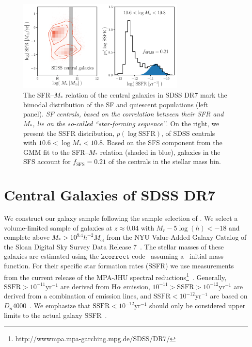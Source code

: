 \documentclass[12pt, letterpaper, preprint, tighten]{aastex62}
\begin{document}
\begin{figure}
\begin{center}
\includegraphics[width=0.75\textwidth]{figs/groupcat.pdf}
    \caption{The SFR--$M_*$ relation of the central galaxies in SDSS DR7
    mark the bimodal distribution of the SF and quiescent populations (left panel). 
    \emph{SF centrals, based on the correlation between their
    SFR and $M_*$, lie on the so-called ``star-forming sequence''}.
    On the right, we present the SSFR distribution, $p(\log\mathrm{SSFR})$,
    of SDSS centrals with $10.6 < \log M_* < 10.8$. Based on the SFS component
    from the \cite{hahn2018a} GMM fit to the SFR--$M_*$ relation (shaded in blue),
    galaxies in the SFS account for $f_\mathrm{SFS} = 0.21$ of the centrals
    in the stellar mass bin.} \label{fig:groupcat}
\end{center}
\end{figure}

\section{Central Galaxies of SDSS DR7} \label{sec:sdss}
We construct our galaxy sample following the sample selection of \cite{tinker2011}.
We select a volume-limited sample of galaxies at $z \approx 0.04$ with
$M_r - 5 \log(h) < -18$ and complete above $M_* > 10^{9.4} h^{-2}M_\odot$ from
the NYU Value-Added Galaxy Catalog \citep[VAGC;][]{blanton2005} of the
Sloan Digital Sky Survey Data Release 7~\citep[SDSS DR7;][]{abazajian2009}.
The stellar masses of these galaxies are estimated using the
$\mathtt{kcorrect}$ code~\citep{blanton2007} assuming a~\cite{chabrier2003}
initial mass function. For their specific star formation rates (SSFR) we use
measurements from the current release of the MPA-JHU spectral
reductions\footnote{http://wwwmpa.mpa-garching.mpg.de/SDSS/DR7/}~\citep{brinchmann2004}.
Generally, $\mathrm{SSFR} > 10^{-11}\mathrm{yr}^{-1}$ are derived from
$\mathrm{H}\alpha$ emission, $10^{-11} > \mathrm{SSFR} > 10^{-12}\mathrm{yr}^{-1}$
are derived from a combination of emission lines, and $\mathrm{SSFR} < 10^{-12}\mathrm{yr}^{-1}$
are based on $D_n 4000$~\citep[see discussion in][]{wetzel2013}. We emphasize that
$\mathrm{SSFR} < 10^{-12}\mathrm{yr}^{-1}$ should only be considered upper limits
to the actual galaxy SSFR~\citep{salim2007}.
\end{document}
